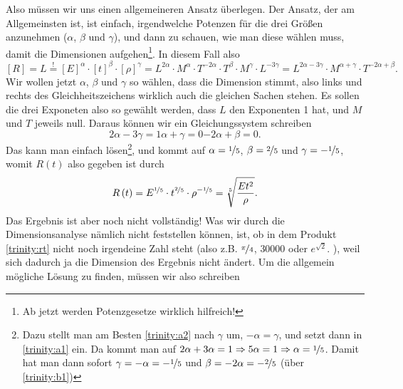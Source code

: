 \begin{Answer}[ref  = trinity]
	Also müssen wir uns einen allgemeineren Ansatz überlegen. Der Ansatz, der am Allgemeinsten ist, ist einfach, irgendwelche Potenzen für die drei Größen anzunehmen ($\alpha$, $\beta$ und $\gamma$), und dann zu schauen, wie man diese wählen muss, damit die Dimensionen aufgehen\footnote[2]{Ab jetzt werden Potenzgesetze wirklich hilfreich!}. In diesem Fall also
	\begin{equation}\label{trinity:dim1}
		\left[R\right] = L \overset{!}{=} \left[E\right]^\alpha\cdot\left[t\right]^\beta\cdot\left[\rho\right]^\gamma = L^{2\alpha} \cdot M^\alpha\cdot T^{-2\alpha}\cdot T^\beta\cdot M^\gamma \cdot L^{-3\gamma} = L^{2\alpha-3\gamma}\cdot M^{\alpha + \gamma} \cdot T^{-2\alpha + \beta}.
	\end{equation}
	Wir wollen jetzt $\alpha$, $\beta$ und $\gamma$ so wählen, dass die Dimension stimmt, also links und rechts des Gleichheitszeichens wirklich auch die gleichen Sachen stehen. Es sollen die drei Exponeten also so gewählt werden, dass $L$ den Exponenten 1 hat, und $M$ und $T$ jeweils null. Daraus können wir ein Gleichungssystem schreiben
	\begin{subequations}\label{trinity:soe}
		\begin{equation}\label{trinity:a1}
			2\alpha - 3\gamma  = 1
		\end{equation}
		\begin{equation}\label{trinity:a2}
			\alpha + \gamma = 0
		\end{equation}
		\begin{equation}\label{trinity:b1}
			-2\alpha + \beta = 0.
		\end{equation}
	\end{subequations}
	Das kann man einfach lösen\footnote[3]{Dazu stellt man am Besten \eqref{trinity:a2} nach $\gamma$ um, $-\alpha = \gamma$, und setzt dann in \eqref{trinity:a1} ein. Da kommt man auf $2\alpha + 3\alpha = 1 \Rightarrow 5\alpha = 1 \Rightarrow \alpha = \nicefrac{1}{5}$. Damit hat man dann sofort $\gamma  = -\alpha = -\nicefrac{1}{5}$ und $\beta = -2\alpha = -\nicefrac{2}{5}$ (über \eqref{trinity:b1})}, und kommt auf $\alpha = \nicefrac{1}{5}$, $\beta = \nicefrac{2}{5}$ und $\gamma = -\nicefrac{1}{5}$, womit $R\left(t\right)$ also gegeben ist durch
	\begin{equation}\label{trinity:rt}
		R\left(t\right) = E^{\nicefrac{1}{5}}\cdot t^{\nicefrac{2}{5}} \cdot \rho^{-\nicefrac{1}{5}} = \sqrt[5]{\frac{Et^2}{\rho}}.
	\end{equation}
	Das Ergebnis ist aber noch nicht vollständig! Was wir durch die Dimensionsanalyse nämlich nicht feststellen können, ist, ob in dem Produkt \eqref{trinity:rt} nicht noch irgendeine Zahl steht (also z.B. $\nicefrac{\pi}{4}$, $30000$ oder $e^{\sqrt{2}}$. ), weil sich dadurch ja die Dimension des Ergebnis nicht ändert. Um die allgemein mögliche Lösung zu finden, müssen wir also schreiben

\end{Answer}
